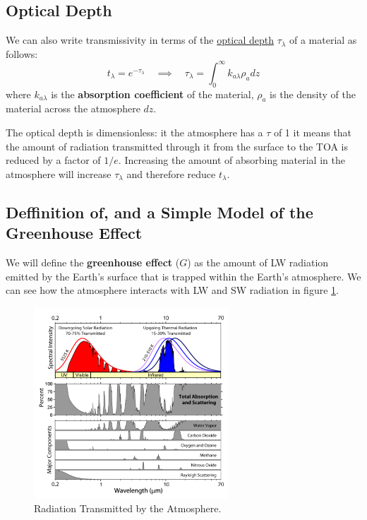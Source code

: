 \subsection{Optical Depth}
\label{sec:opticaldepth}

We can also write transmissivity in terms of the \hyperlink{glo:opticaldepth}{optical depth} $\tau_\lambda$ of a
material as follows:
$$
t_\lambda = e^{-\tau_\lambda} \quad \implies \quad \tau_\lambda = \int_0^\infty k_{a \lambda} \rho_{a} dz
$$
where \hypertarget{absorption_coefficient}{$k_{a \lambda}$} is the \textbf{absorption coefficient} of the material, 
$\rho_a$ is the density of the material across the atmosphere $dz$. 

The optical depth is dimensionless: it the atmosphere
has a $\tau$ of 1 it means that the amount of radiation transmitted through it from the surface to the \gls{TOA}
is reduced by a factor of $1/e$. Increasing the amount of absorbing material in the atmosphere will increase $\tau_\lambda$
and therefore reduce $t_\lambda$.

\subsection{Deffinition of, and a Simple Model of the Greenhouse Effect}
\label{sec:greenhouse_definition}
We will define the \textbf{greenhouse effect} ($G$) as the amount of \gls{LW} radiation emitted by the Earth's
surface that is trapped within the Earth's atmosphere. We can see how the atmosphere interacts with \gls{LW}
and \gls{SW} radiation in figure \ref{fig:transmitted_radiation}.

\begin{figure}[h]
    \centering
    \includegraphics[width=0.65\textwidth]{figures/transmitted_radiation.png}
    \caption{Radiation Transmitted by the Atmosphere.}
    \label{fig:transmitted_radiation}
\end{figure}

